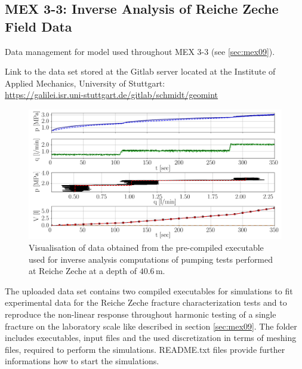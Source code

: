 \subsection{MEX 3-3: Inverse Analysis of Reiche Zeche Field Data}

Data management for model used throughout MEX 3-3 (see \ref{sec:mex09}).

Link to the data set stored at the Gitlab server located at the Institute of Applied Mechanics, University of Stuttgart:\\
\hyperlink{https://galilei.isr.uni-stuttgart.de/gitlab/schmidt/geomint}{https://galilei.isr.uni-stuttgart.de/gitlab/schmidt/geomint}\\
\begin{figure}[!ht]
\begin{center}
\includegraphics[width=1.0\textwidth]{./figures/data_management_reiche_zeche_40_6.png}
\end{center}
\caption{Visualisation of data obtained from the pre-compiled executable used for inverse analysis computations of pumping tests performed at Reiche Zeche at a depth of $40.6\,$m.}
\label{fig:DataReicheZeche}
\end{figure}

The uploaded data set contains two compiled executables for simulations to fit experimental data for the Reiche Zeche fracture characterization tests and to reproduce the non-linear response throughout harmonic testing of a single fracture on the laboratory scale like described in section \ref{sec:mex09}. The folder includes executables, input files and the used discretization in terms of meshing files, required to perform the simulations. README.txt files provide further informations how to start the simulations.

